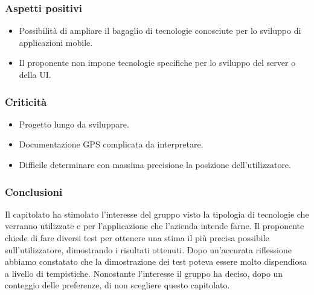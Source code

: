 	\subsubsection{Aspetti positivi}
		\begin{itemize}
			\item Possibilità di ampliare il bagaglio di tecnologie conosciute per lo sviluppo di applicazioni mobile.
			\item Il proponente non impone tecnologie specifiche per lo sviluppo del server o
			della UI.
		\end{itemize}

	\subsubsection{Criticità}
		\begin{itemize}
			\item Progetto lungo da sviluppare.
			\item Documentazione GPS complicata da interpretare.
			\item Difficile determinare con massima precisione la posizione dell'utilizzatore.
		\end{itemize}
	
	\subsubsection{Conclusioni}
		Il capitolato ha stimolato l'interesse del gruppo visto la tipologia di tecnologie che verranno utilizzate e per l'applicazione che l'azienda intende farne. Il proponente chiede di fare diversi test per ottenere una stima il più precisa possibile sull'utilizzatore, dimostrando i risultati ottenuti. Dopo un'accurata riflessione abbiamo constatato che la dimostrazione dei test poteva essere molto dispendiosa a livello di tempistiche. Nonostante l'interesse il gruppo ha deciso, dopo un conteggio delle preferenze, di non scegliere questo capitolato.

